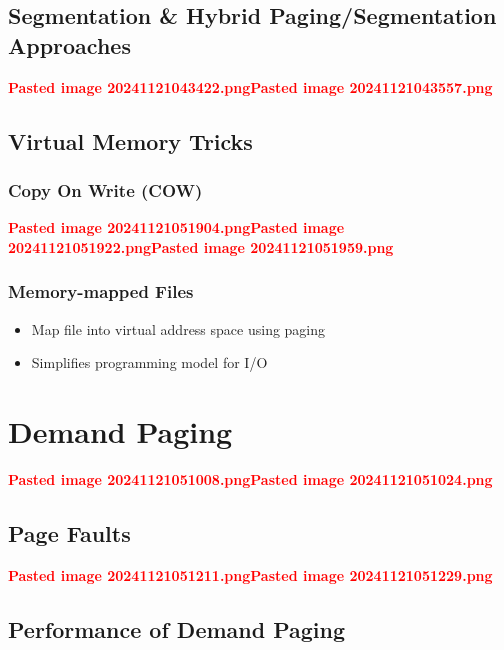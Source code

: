 \subsection*{Segmentation \& Hybrid Paging/Segmentation Approaches}

\textcolor{red}{\textbf{Pasted image 20241121043422.png}}\textcolor{red}{\textbf{Pasted image 20241121043557.png}}

\subsection*{Virtual Memory Tricks}

\subsubsection*{Copy On Write (COW)}

\textcolor{red}{\textbf{Pasted image 20241121051904.png}}\textcolor{red}{\textbf{Pasted image 20241121051922.png}}\textcolor{red}{\textbf{Pasted image 20241121051959.png}}

\subsubsection*{Memory-mapped Files}

\begin{itemize}
\tightlist
\item
  Map file into virtual address space using paging
\item
  Simplifies programming model for I/O
\end{itemize}

\section*{Demand Paging}

\textcolor{red}{\textbf{Pasted image 20241121051008.png}}\textcolor{red}{\textbf{Pasted image 20241121051024.png}}

\subsection*{Page Faults}

\textcolor{red}{\textbf{Pasted image 20241121051211.png}}\textcolor{red}{\textbf{Pasted image 20241121051229.png}}

\subsection*{Performance of Demand Paging}

